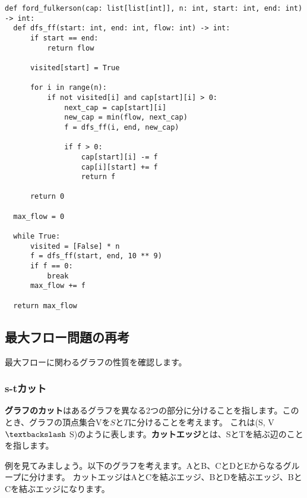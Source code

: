 \begin{lstlisting}[caption=フォード・ファルカーソン法の実装, label=ford_fulkerson, frame=TRBL, label={ford_fulkerson}]
def ford_fulkerson(cap: list[list[int]], n: int, start: int, end: int) -> int:
  def dfs_ff(start: int, end: int, flow: int) -> int:
      if start == end:
          return flow

      visited[start] = True

      for i in range(n):
          if not visited[i] and cap[start][i] > 0: 
              next_cap = cap[start][i]
              new_cap = min(flow, next_cap)
              f = dfs_ff(i, end, new_cap)

              if f > 0:
                  cap[start][i] -= f
                  cap[i][start] += f
                  return f

      return 0

  max_flow = 0

  while True:
      visited = [False] * n
      f = dfs_ff(start, end, 10 ** 9)
      if f == 0:
          break
      max_flow += f

  return max_flow
\end{lstlisting}

\subsection{最大フロー問題の再考}
最大フローに関わるグラフの性質を確認します。
\subsubsection{s-tカット}
\textbf{グラフのカット}はあるグラフを異なる2つの部分に分けることを指します。このとき、グラフの頂点集合Vを$S$と$T$に分けることを考えます。
これは(S, V $\textbackslash$ S)のように表します。\textbf{カットエッジ}とは、SとTを結ぶ辺のことを指します。

例を見てみましょう。以下のグラフを考えます。AとB、CとDとEからなるグループに分けます。
カットエッジはAとCを結ぶエッジ、BとDを結ぶエッジ、BとCを結ぶエッジになります。

\vspace{0.5cm}

\begin{center}
\end{center}

